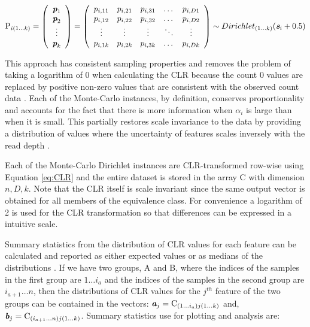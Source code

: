 \documentclass[10pt]{article}
\begin{document}
\begin{equation}
\textrm{P}_{i (1 \ldots k)}=
\left( \begin{array}{c}
    \textit{\textbf{p}}_1 \\
   \textit{\textbf{p}}_2 \\
    \vdots \\
    \textit{\textbf{p}}_k \\
\end{array} \right)=
\left( \begin{array}{ccccc}
    p_{i,11} & p_{i,21} & p_{i,31} & \dots  & p_{i,D1} \\
    p_{i,12} & p_{i,22} & p_{i,32} & \dots  & p_{i,D2} \\
    \vdots & \vdots & \vdots & \ddots & \vdots \\
    p_{i,1k} & p_{i,2k} & p_{i,3k} & \dots  & p_{i,Dk}\\
\end{array} \right)
\sim Dirichlet_{(1 \ldots k)}(\textit{\textbf{s}}_i + 0.5)
\label{eq:matrix}
\end{equation}


This approach has consistent sampling properties and removes the problem of taking a logarithm of 0 when calculating the CLR because the count 0 values are replaced by positive non-zero values that are consistent with the observed count data . Each of the Monte-Carlo instances, by definition, conserves proportionality and accounts for the fact that there is more information when $\alpha_i$ is large than when it is small. This partially restores scale invariance to the data by providing a distribution of values where the uncertainty of  features scales inversely with the read depth . 

Each of the Monte-Carlo Dirichlet instances are CLR-transformed row-wise using Equation \ref{eq:CLR} and the entire dataset is stored in the array $\textrm{C}$ with dimension ${n,D,k}$. Note that the CLR itself is scale invariant since the same output vector is obtained for all members of the equivalence class. For convenience a logarithm of 2 is used for the CLR transformation so that differences can be expressed in a intuitive scale.  

Summary statistics from the distribution of CLR values for each feature can be calculated and reported as either expected values or as medians of the distributions . If we have two groups, A and B, where the indices of the samples in the first group are $1 \ldots i_a$ and the indices of the samples in the second group are $i_{a + 1} \ldots n$, then the distributions of CLR values for the $j^{th}$ feature of the two groups can be contained in the vectors: $\textit{\textbf{a}}_j = \mathrm{C}_{(1 \ldots i_a)j(1...k)}$ and, $\textit{\textbf{b}}_j = \mathrm{C}_{(i_{a + 1} \ldots n)j(1...k)}$. Summary statistics use for plotting and analysis are: 
\end{document}
